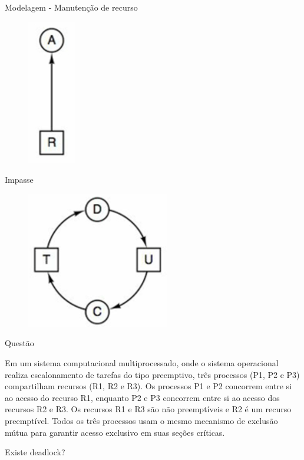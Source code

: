 \documentclass[aspectratio=169,
				xcolor=table]{beamer}
\begin{document}
	\begin{frame}{Modelagem - Manutenção de recurso}
		
		\begin{figure}
			\centering
			\includegraphics[keepaspectratio, height=0.5\paperheight]{../figs/cap07/manutencao.png}			
		\end{figure}
	\end{frame}
	
	\begin{frame}{Impasse}
		
		\begin{figure}
			\centering
			\includegraphics[keepaspectratio, height=0.75\paperheight]{../figs/cap07/impasse.png}			
		\end{figure}
	\end{frame}

	\begin{frame}{Questão}
	
		\begin{block}{}
		Em um sistema computacional multiprocessado, onde o sistema operacional realiza escalonamento de tarefas do tipo preemptivo, três processos (P1, P2 e P3) compartilham recursos (R1, R2 e R3). Os processos P1 e P2 concorrem entre si ao acesso do recurso R1, enquanto P2 e P3 concorrem entre si ao acesso dos recursos R2 e R3. Os recursos R1 e R3 são não preemptíveis e R2 é um recurso preemptível. Todos os três processos usam o mesmo mecanismo de exclusão mútua para garantir acesso exclusivo em suas seções críticas.
		\end{block}
		\vspace{1em}
		\Huge \centering \alert{Existe deadlock?}
	\end{frame}
	
\end{document}
